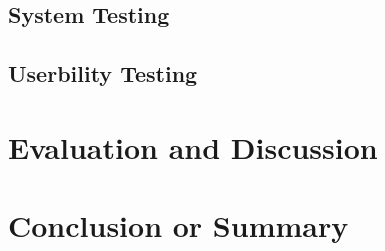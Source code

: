 \documentclass[11pt]{article}
\begin{document}
	\subsection{System Testing}
	
	\subsection{Userbility Testing}
	
	\section{Evaluation and Discussion}
	
	\section{Conclusion or Summary}
	
	
	 
	
\end{document}
